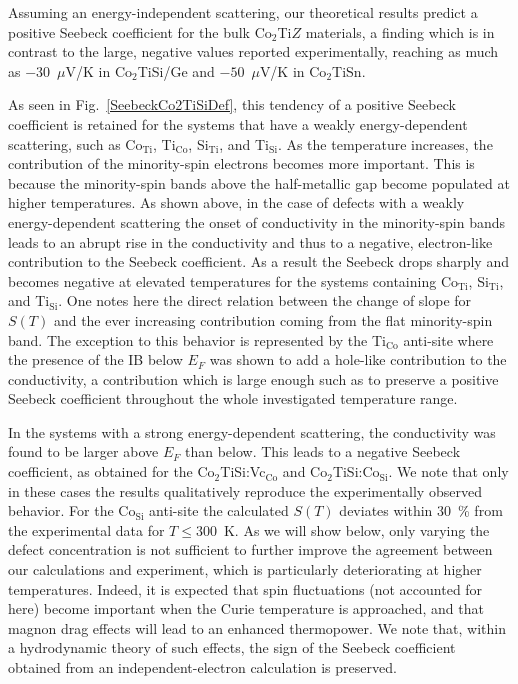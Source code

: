 \documentclass[aps,prb,twocolumn,superscriptaddress,showpacs]{revtex4}
\newcommand{\FG}[1]{Fig.~\ref{#1}}
\begin{document}
Assuming an energy-independent scattering, our theoretical
results predict a positive Seebeck coefficient for the
bulk Co$_2$Ti$Z$ materials,\cite{GKP14,BFB+10} 
a finding which is in contrast to the large, negative
values reported experimentally, 
reaching as much as $-30$~$\mu$V/K in 
Co$_2$TiSi/Ge and $-50$~$\mu$V/K in
Co$_2$TiSn.\cite{BFB+10,BOG+10} 

As seen in \FG{SeebeckCo2TiSiDef}, this tendency of
a positive Seebeck coefficient is retained for the 
systems that have a weakly energy-dependent scattering,
such as Co$_\text{Ti}$, Ti$_\text{Co}$, Si$_\text{Ti}$, 
and Ti$_\text{Si}$. As the temperature increases,
the contribution of the minority-spin electrons
becomes more important. This is because the minority-spin bands 
above the half-metallic gap become populated at higher temperatures.
As shown above, in the case of defects with a weakly
energy-dependent scattering the onset of conductivity 
in the minority-spin bands leads to an abrupt rise in the conductivity 
and thus to a negative, electron-like contribution to the Seebeck 
coefficient. As a result the Seebeck drops sharply and becomes 
negative at elevated temperatures for the systems
containing Co$_\text{Ti}$, Si$_\text{Ti}$, and Ti$_\text{Si}$.
One notes here the direct relation between the 
change of slope for $S(T)$ and the ever increasing
contribution coming from the flat minority-spin band.
The exception to this behavior is represented
by the Ti$_\text{Co}$ anti-site where the presence
of the IB below $E_F$ was shown to add
a hole-like contribution to the conductivity,
a contribution which is large enough such as to
preserve a positive Seebeck coefficient throughout the whole
investigated temperature range.

In the systems with a strong energy-dependent
scattering, the conductivity was found to be 
larger above $E_F$ than below. This leads to a negative 
Seebeck coefficient, as obtained for the Co$_2$TiSi:Vc$_\text{Co}$ 
and Co$_2$TiSi:Co$_\text{Si}$.
We note that only in these cases the results 
qualitatively reproduce the experimentally 
observed behavior. For the Co$_\text{Si}$ anti-site
the calculated $S(T)$ deviates within $30$~\%
from the experimental data for $T\leq 300$~K. 
As we will show below, only varying the defect
concentration is not sufficient to further improve the 
agreement between our calculations and experiment, 
which is particularly deteriorating at higher
temperatures.
Indeed, it is expected that spin fluctuations
(not accounted for here) become important when the Curie 
temperature is approached, and that 
magnon drag effects will lead to an enhanced thermopower.
We note that, within a hydrodynamic theory of such effects, 
the sign of the Seebeck coefficient obtained from an 
independent-electron calculation is preserved.\cite{WDT+16}
\end{document}
